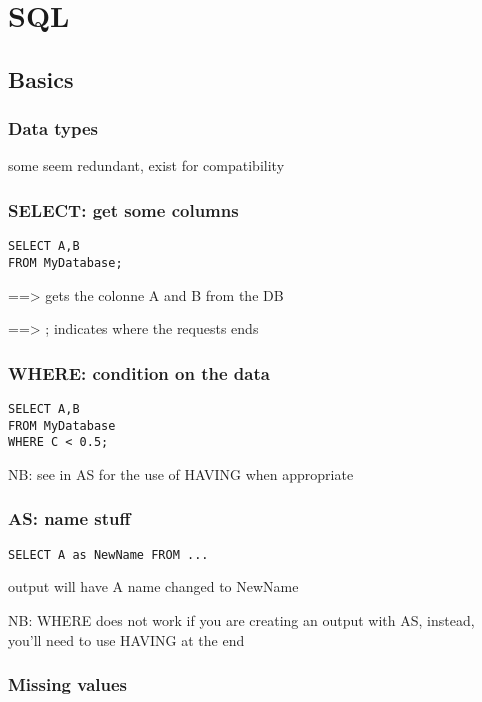 \chapter{SQL}

\section{Basics}


	\subsection{Data types}
		 some seem redundant, exist for compatibility

	\subsection{SELECT: get some columns}

\begin{lstlisting}
SELECT A,B
FROM MyDatabase;
\end{lstlisting}

	==> gets the colonne A and B from the DB

	==> ; indicates where the requests ends


	\subsection{WHERE: condition on the data}

\begin{lstlisting}
SELECT A,B
FROM MyDatabase
WHERE C < 0.5;
\end{lstlisting}

NB: see in AS for the use of HAVING when appropriate

	\subsection{AS: name stuff}

\begin{lstlisting}
SELECT A as NewName FROM ...
\end{lstlisting}

		output will have A name changed to NewName

		NB: WHERE does not work if you are creating an output with AS, instead, you'll need to use HAVING at the end

	\subsection{Missing values}

